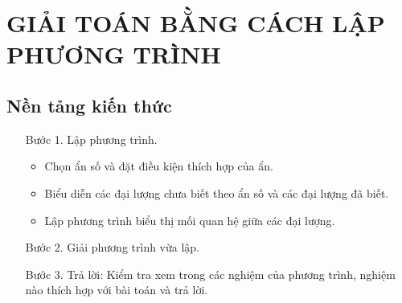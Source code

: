 
\section{GIẢI TOÁN BẰNG CÁCH LẬP PHƯƠNG TRÌNH}
\subsection{Nền tảng kiến thức}
\begin{itemize}
	\item [Bước 1.] Lập phương trình.
	\begin{itemize}
		\item Chọn ẩn số và đặt điều kiện thích hợp của ẩn.
		\item Biểu diễn các đại lượng chưa biết theo ẩn số và các đại lượng đã biết.
		\item Lập phương trình biểu thị mối quan hệ giữa các đại lượng.
	\end{itemize}
\item [Bước 2.] Giải phương trình vừa lập.
\item [Bước 3.] Trả lời: Kiểm tra xem trong các nghiệm của phương trình, nghiệm nào thích hợp với bài toán và trả lời.
\end{itemize}
